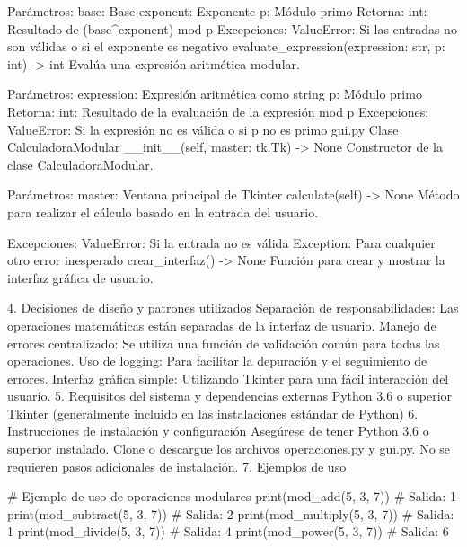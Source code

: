 Parámetros:
base: Base
exponent: Exponente
p: Módulo primo
Retorna:
int: Resultado de (base^exponent) mod p
Excepciones:
ValueError: Si las entradas no son válidas o si el exponente es negativo
evaluate_expression(expression: str, p: int) -> int
Evalúa una expresión aritmética modular.

Parámetros:
expression: Expresión aritmética como string
p: Módulo primo
Retorna:
int: Resultado de la evaluación de la expresión mod p
Excepciones:
ValueError: Si la expresión no es válida o si p no es primo
gui.py
Clase CalculadoraModular
__init__(self, master: tk.Tk) -> None
Constructor de la clase CalculadoraModular.

Parámetros:
master: Ventana principal de Tkinter
calculate(self) -> None
Método para realizar el cálculo basado en la entrada del usuario.

Excepciones:
ValueError: Si la entrada no es válida
Exception: Para cualquier otro error inesperado
crear_interfaz() -> None
Función para crear y mostrar la interfaz gráfica de usuario.

4. Decisiones de diseño y patrones utilizados
Separación de responsabilidades: Las operaciones matemáticas están separadas de la interfaz de usuario.
Manejo de errores centralizado: Se utiliza una función de validación común para todas las operaciones.
Uso de logging: Para facilitar la depuración y el seguimiento de errores.
Interfaz gráfica simple: Utilizando Tkinter para una fácil interacción del usuario.
5. Requisitos del sistema y dependencias externas
Python 3.6 o superior
Tkinter (generalmente incluido en las instalaciones estándar de Python)
6. Instrucciones de instalación y configuración
Asegúrese de tener Python 3.6 o superior instalado.
Clone o descargue los archivos operaciones.py y gui.py.
No se requieren pasos adicionales de instalación.
7. Ejemplos de uso

# Ejemplo de uso de operaciones modulares
print(mod_add(5, 3, 7))  # Salida: 1
print(mod_subtract(5, 3, 7))  # Salida: 2
print(mod_multiply(5, 3, 7))  # Salida: 1
print(mod_divide(5, 3, 7))  # Salida: 4
print(mod_power(5, 3, 7))  # Salida: 6

